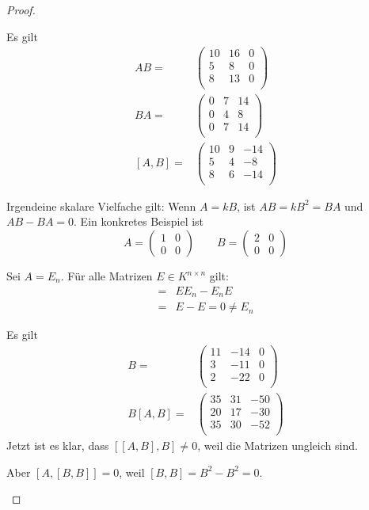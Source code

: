 \begin{proof}
	\begin{parts}
		\item Es gilt
		\begin{align*}
			AB=&\left(
			\begin{array}{ccc}
				10 & 16 & 0 \\
				5 & 8 & 0 \\
				8 & 13 & 0 \\
			\end{array}
			\right)\\
			BA=& \left(
			\begin{array}{ccc}
				0 & 7 & 14 \\
				0 & 4 & 8 \\
				0 & 7 & 14 \\
			\end{array}
			\right)\\
			[A,B]=&\left(
			\begin{array}{ccc}
				10 & 9 & -14 \\
				5 & 4 & -8 \\
				8 & 6 & -14 \\
			\end{array}
			\right)
		\end{align*}
		\item Irgendeine skalare Vielfache gilt: Wenn $A=kB$, ist $AB=kB^2=BA$ und $AB-BA=0$. Ein konkretes Beispiel ist
		\[A=\begin{pmatrix}1 & 0 \\ 0 & 0\end{pmatrix}\qquad B=\begin{pmatrix}2 & 0 \\ 0 & 0\end{pmatrix}\]
		\item Sei $A=E_n$. F\"{u}r alle Matrizen $E\in K^{n\times n}$ gilt:
		\begin{align*}
			[E,E_n]=& EE_n - E_nE\\
			=& E - E = 0\neq E_n
		\end{align*}
		\item Es gilt
		\begin{align*}
		[A,B]B=& \left(
		\begin{array}{ccc}
			11 & -14 & 0 \\
			3 & -11 & 0 \\
			2 & -22 & 0 \\
		\end{array}
		\right)\\
		B[A,B]=& \left(
		\begin{array}{ccc}
			35 & 31 & -50 \\
			20 & 17 & -30 \\
			35 & 30 & -52 \\
		\end{array}
		\right)
		\end{align*}
		Jetzt ist es klar, dass $[[A,B],B]\neq 0$, weil die Matrizen ungleich sind.
		
		Aber $[A,[B,B]]=0$, weil $[B,B]=B^2-B^2=0$.\qedhere 
	\end{parts}
\end{proof}

